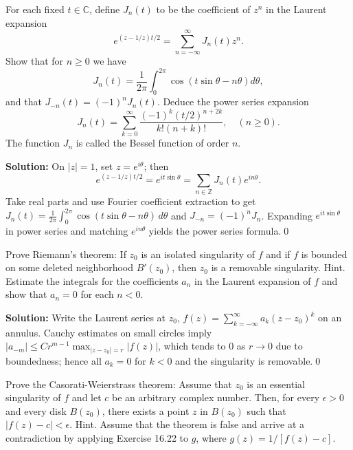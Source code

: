 \begin{problembox}
For each fixed \( t \in \mathbb{C} \), define \( J_n(t) \) to be the coefficient of \( z^n \) in the Laurent expansion
\[ e^{(z - 1/z)t/2} = \sum_{n=-\infty}^{\infty} J_n(t) z^n. \]
Show that for \( n \geq 0 \) we have
\[ J_n(t) = \frac{1}{2\pi} \int_0^{2\pi} \cos (t \sin \theta - n \theta) d\theta, \]
and that \( J_{-n}(t) = (-1)^n J_n(t) \). Deduce the power series expansion
\[ J_n(t) = \sum_{k=0}^{\infty} \frac{(-1)^k (t/2)^{n + 2k}}{k! (n + k)!}, \quad (n \geq 0). \]
The function \( J_n \) is called the Bessel function of order \( n \).
\end{problembox}

\bigskip\noindent\textbf{Solution:}
On $|z|=1$, set $z=e^{i\theta}$; then
\[e^{(z-1/z)t/2}=e^{i t\sin\theta}=\sum_{n\in\mathbb Z} J_n(t)e^{in\theta}.
\]
Take real parts and use Fourier coefficient extraction to get $J_n(t)=\frac{1}{2\pi}\int_0^{2\pi}\cos(t\sin\theta-n\theta)\,d\theta$ and $J_{-n}=(-1)^nJ_n$. Expanding $e^{i t\sin\theta}$ in power series and matching $e^{in\theta}$ yields the power series formula.\qed


\begin{problembox}
Prove Riemann's theorem: If \( z_0 \) is an isolated singularity of \( f \) and if \( f \) is bounded on some deleted neighborhood \( B'(z_0) \), then \( z_0 \) is a removable singularity. Hint. Estimate the integrals for the coefficients \( a_n \) in the Laurent expansion of \( f \) and show that \( a_n = 0 \) for each \( n < 0 \).
\end{problembox}

\bigskip\noindent\textbf{Solution:}
Write the Laurent series at $z_0$, $f(z)=\sum_{k=-\infty}^{\infty} a_k(z-z_0)^k$ on an annulus. Cauchy estimates on small circles imply $|a_{-m}|\le C r^{m-1}\max_{|z-z_0|=r}|f(z)|$, which tends to $0$ as $r\to0$ due to boundedness; hence all $a_{k}=0$ for $k<0$ and the singularity is removable.\qed


\begin{problembox}
Prove the Casorati-Weierstrass theorem: Assume that \( z_0 \) is an essential singularity of \( f \) and let \( c \) be an arbitrary complex number. Then, for every \( \epsilon > 0 \) and every disk \( B(z_0) \), there exists a point \( z \) in \( B(z_0) \) such that \( |f(z) - c| < \epsilon \). Hint. Assume that the theorem is false and arrive at a contradiction by applying Exercise 16.22 to \( g \), where \( g(z) = 1/[f(z) - c] \).
\end{problembox}

